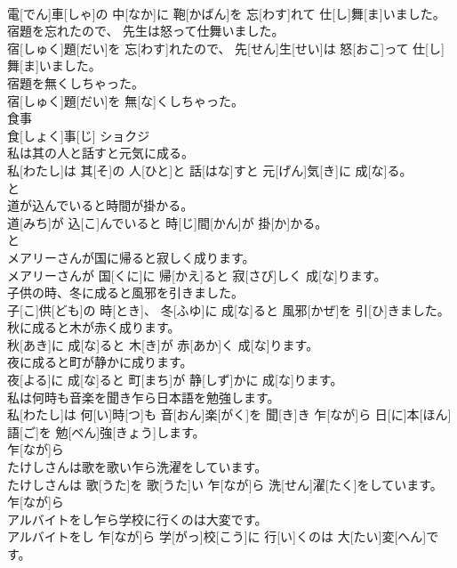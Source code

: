 \documentclass[8pt]{extreport}
\begin{document}
\begin{CJK}{UTF8}{min}
\\	電[でん]車[しゃ]の 中[なか]に 鞄[かばん]を 忘[わす]れて 仕[し]舞[ま]いました。
\\	宿題を忘れたので、 先生は怒って仕舞いました。	
\\	宿[しゅく]題[だい]を 忘[わす]れたので、 先[せん]生[せい]は 怒[おこ]って 仕[し]舞[ま]いました。
\\	宿題を無くしちゃった。	
\\	宿[しゅく]題[だい]を 無[な]くしちゃった。
\\	食事	
\\	食[しょく]事[じ]	ショクジ
\\	私は其の人と話すと元気に成る。	
\\	私[わたし]は 其[そ]の 人[ひと]と 話[はな]すと 元[げん]気[き]に 成[な]る。 
\\	と 
\\	道が込んでいると時間が掛かる。	
\\	道[みち]が 込[こ]んでいると 時[じ]間[かん]が 掛[か]かる。 
\\	と 
\\	メアリーさんが国に帰ると寂しく成ります。	
\\	メアリーさんが 国[くに]に 帰[かえ]ると 寂[さび]しく 成[な]ります。
\\	子供の時、冬に成ると風邪を引きました。	
\\	子[こ]供[ども]の 時[とき]、 冬[ふゆ]に 成[な]ると 風邪[かぜ]を 引[ひ]きました。
\\	秋に成ると木が赤く成ります。	
\\	秋[あき]に 成[な]ると 木[き]が 赤[あか]く 成[な]ります。
\\	夜に成ると町が静かに成ります。	
\\	夜[よる]に 成[な]ると 町[まち]が 静[しず]かに 成[な]ります。
\\	私は何時も音楽を聞き乍ら日本語を勉強します。	
\\	私[わたし]は 何[い]時[つ]も 音[おん]楽[がく]を 聞[き]き 乍[なが]ら 日[に]本[ほん]語[ご]を 勉[べん]強[きょう]します。 
\\	乍[なが]ら 
\\	たけしさんは歌を歌い乍ら洗濯をしています。	
\\	たけしさんは 歌[うた]を 歌[うた]い 乍[なが]ら 洗[せん]濯[たく]をしています。 
\\	乍[なが]ら 
\\	アルバイトをし乍ら学校に行くのは大変です。	
\\	アルバイトをし 乍[なが]ら 学[がっ]校[こう]に 行[い]くのは 大[たい]変[へん]です。 

\end{CJK}
\end{document}

